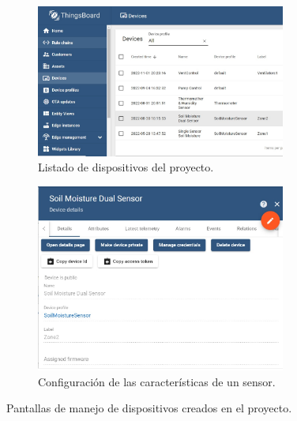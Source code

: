 \begin{figure}[!htpb]
     \centering
     \begin{subfigure}[b]{0.75\textwidth}
		\centering
	    \includegraphics[width=0.9\textwidth]{./Figures/chapter3/TB_Devices4.jpg}
	    \caption[Listado de dispositivos del proyecto]{Listado de dispositivos del proyecto.}
	    \label{fig:tb_devices3}
     \end{subfigure}
     \hfill
     \begin{subfigure}[b]{0.75\textwidth}
	     \centering
	     \includegraphics[width=0.9\textwidth]{./Figures/chapter3/TB_Devices5.jpg}
	     \caption[Configuración de las características de un sensor]{Configuración de las características de un sensor.}
	    \label{fig:tb_devices4}
     \end{subfigure}
    \caption[Pantallas de manejo de dispositivos creados en el proyecto]{Pantallas de manejo de dispositivos creados en el proyecto.}
	\label{fig:tb_devices}	
\end{figure}



